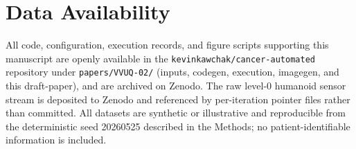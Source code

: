 {}
\section*{Data Availability}
\label{sec:data}

All code, configuration, execution records, and figure scripts supporting this
manuscript are openly available in the \texttt{kevinkawchak/cancer-automated}
repository under \texttt{papers/VVUQ-02/} (inputs, codegen, execution, imagegen,
and this draft-paper), and are archived on Zenodo. The raw level-0 humanoid sensor
stream is deposited to Zenodo and referenced by per-iteration pointer files rather
than committed. All datasets are synthetic or illustrative and reproducible from
the deterministic seed 20260525 described in the Methods; no patient-identifiable
information is included.
